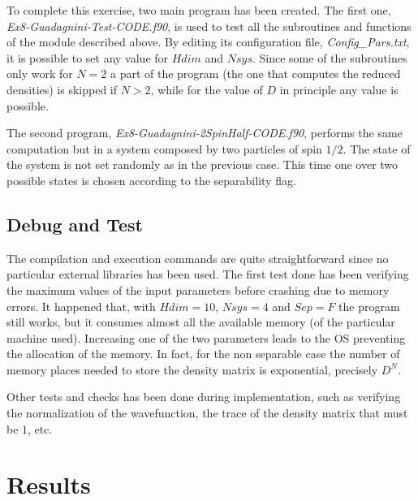 \documentclass[11pt,a4paper]{article}
\begin{document}




To complete this exercise, two main program has been created. The first one, \textit{Ex8-Guadagnini-Test-CODE.f90}, is used to test all the subroutines and functions of the module described above. 
By editing its configuration file, \textit{Config\_Pars.txt}, it is possible to set any value for $Hdim$ and $Nsys$. 
Since some of the subroutines only work for $N=2$ a part of the program (the one that computes the reduced densities) is skipped if $N>2$, while for the value of $D$ in principle any value is possible.

The second program, \textit{Ex8-Guadagnini-2SpinHalf-CODE.f90}, performs the same computation but in a system composed by two particles of spin $1/2$. The state of the system is not set randomly as in the previous case. This time one over two possible states is chosen according to the separability flag.

\subsection{Debug and Test}
The compilation and execution commands are quite straightforward since no particular external libraries has been used.
The first test done has been verifying the maximum values of the input parameters before crashing due to memory errors. It happened that, with $Hdim = 10$, $Nsys = 4$ and $Sep = F$ the program still works, but it consumes almost all the available memory (of the particular machine used). 
Increasing one of the two parameters leads to the OS preventing the allocation of the memory. In fact, for the non separable case the number of memory places needed to store the density matrix is exponential, precisely $D^N$.
 
Other tests and checks has been done during implementation, such as verifying the normalization of the wavefunction, the trace of the density matrix that must be $1$, etc.

\section{Results} %
\end{document}
